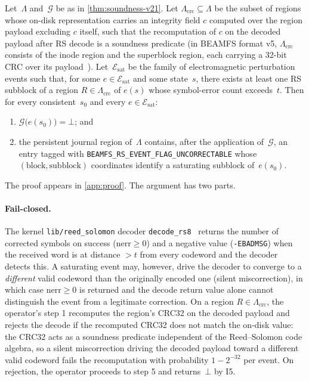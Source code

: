 \begin{theorem}\label{thm:saturation-v22a}
Let~\(\Lambda\) and~\(\mathcal{G}\) be as in
\cref{thm:soundness-v21}. Let \(\Lambda_{\mathrm{crc}} \subseteq \Lambda\)
be the subset of regions whose on-disk representation carries an
integrity field \(c\) computed over the region payload excluding
\(c\) itself, such that the recomputation of \(c\) on the decoded
payload after RS decode is a soundness predicate (in BEAMFS format
v5, \(\Lambda_{\mathrm{crc}}\) consists of the inode region and
the superblock region, each carrying a 32-bit CRC over its
payload~\cite{beamfs-impl}). Let~\(\mathcal{E}_{\mathrm{sat}}\) be
the family of electromagnetic perturbation events such that, for
some \(e \in \mathcal{E}_{\mathrm{sat}}\) and some state~\(s\),
there exists at least one RS subblock of a region
\(R \in \Lambda_{\mathrm{crc}}\) of \(e(s)\) whose symbol-error
count exceeds~\(t\). Then for every consistent~\(s_0\) and every
\(e \in \mathcal{E}_{\mathrm{sat}}\):
\begin{enumerate}
\item \(\mathcal{G}\bigl(e(s_0)\bigr) = \bot\); and
\item the persistent journal region of~\(\Lambda\) contains, after
  the application of~\(\mathcal{G}\), an entry tagged with
  \texttt{BEAMFS\_RS\_EVENT\_FLAG\_UNCORRECTABLE} whose
  \((\text{block},\text{subblock})\) coordinates identify a
  saturating subblock of~\(e(s_0)\).
\end{enumerate}
\end{theorem}

The proof appears in \cref{app:proof}. The argument has two parts.

\paragraph{Fail-closed.}
The kernel \texttt{lib/reed\_solomon} decoder
\texttt{decode\_rs8}~\cite{kernelrslib} returns the number of
corrected symbols on success (\(\mathrm{nerr} \geq 0\)) and a
negative value (\texttt{-EBADMSG}) when the received word is at
distance \(> t\) from every codeword and the decoder detects this.
A saturating event may, however, drive the decoder to converge to a
\emph{different} valid codeword than the originally encoded one
(silent miscorrection), in which case \(\mathrm{nerr} \geq 0\) is
returned and the decode return value alone cannot distinguish the
event from a legitimate correction. On a region
\(R \in \Lambda_{\mathrm{crc}}\), the operator's step 1 recomputes
the region's CRC32 on the decoded payload and rejects the decode
if the recomputed CRC32 does not match the on-disk value: the CRC32
acts as a soundness predicate independent of the Reed--Solomon code
algebra, so a silent miscorrection driving the decoded payload
toward a different valid codeword fails the recomputation with
probability \(1 - 2^{-32}\) per event. On rejection, the operator
proceeds to step 5 and returns~\(\bot\) by I5.

